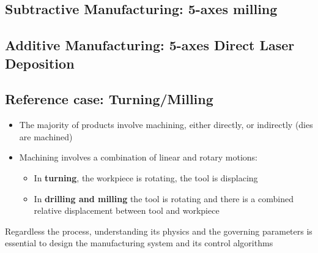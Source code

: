 \documentclass[
  letterpaper,
  DIV=11,
  numbers=noendperiod]{scrartcl}
\providecommand{\tightlist}{%
  \setlength{\itemsep}{0pt}\setlength{\parskip}{0pt}}
\begin{document}
\subsection{Subtractive Manufacturing: 5-axes
milling}\label{subtractive-manufacturing-5-axes-milling}

\subsection{Additive Manufacturing: 5-axes Direct Laser
Deposition}\label{additive-manufacturing-5-axes-direct-laser-deposition}

\subsection{Reference case:
Turning/Milling}\label{reference-case-turningmilling}

\begin{itemize}
\tightlist
\item
  The majority of products involve machining, either directly, or
  indirectly (dies are machined)
\item
  Machining involves a combination of linear and rotary motions:

  \begin{itemize}
  \tightlist
  \item
    In \textbf{turning}, the workpiece is rotating, the tool is
    displacing
  \item
    In \textbf{drilling and milling} the tool is rotating and there is a
    combined relative displacement between tool and workpiece
  \end{itemize}
\end{itemize}

\begin{tcolorbox}[enhanced jigsaw, arc=.35mm, bottomrule=.15mm, bottomtitle=1mm, breakable, colback=white, colbacktitle=quarto-callout-important-color!10!white, colframe=quarto-callout-important-color-frame, coltitle=black, left=2mm, leftrule=.75mm, opacityback=0, opacitybacktitle=0.6, rightrule=.15mm, title=\textcolor{quarto-callout-important-color}{\faExclamation}\hspace{0.5em}{Important}, titlerule=0mm, toprule=.15mm, toptitle=1mm]

Regardless the process, understanding its physics and the governing
parameters is essential to design the manufacturing system and its
control algorithms

\end{tcolorbox}
\end{document}
